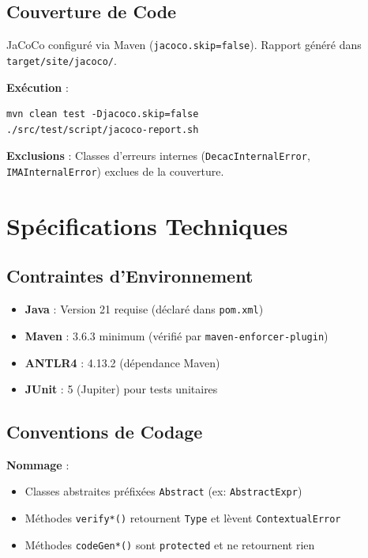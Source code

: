\documentclass[12pt,a4paper]{article}
\begin{document}
\subsection{Couverture de Code}

JaCoCo configuré via Maven (\texttt{jacoco.skip=false}). Rapport généré dans \texttt{target/site/jacoco/}.

\textbf{Exécution} :

\begin{lstlisting}[style=bashstyle]
mvn clean test -Djacoco.skip=false
./src/test/script/jacoco-report.sh
\end{lstlisting}

\textbf{Exclusions} : Classes d'erreurs internes (\texttt{DecacInternalError}, \texttt{IMAInternalError}) exclues de la couverture.

\section{Spécifications Techniques}

\subsection{Contraintes d'Environnement}

\begin{itemize}[itemsep=0.2em]
    \item \textbf{Java} : Version 21 requise (déclaré dans \texttt{pom.xml})
    \item \textbf{Maven} : 3.6.3 minimum (vérifié par \texttt{maven-enforcer-plugin})
    \item \textbf{ANTLR4} : 4.13.2 (dépendance Maven)
    \item \textbf{JUnit} : 5 (Jupiter) pour tests unitaires
\end{itemize}

\subsection{Conventions de Codage}

\textbf{Nommage} :

\begin{itemize}[itemsep=0.2em]
    \item Classes abstraites préfixées \texttt{Abstract} (ex: \texttt{AbstractExpr})
    \item Méthodes \texttt{verify*()} retournent \texttt{Type} et lèvent \texttt{ContextualError}
    \item Méthodes \texttt{codeGen*()} sont \texttt{protected} et ne retournent rien
\end{itemize}
\end{document}
